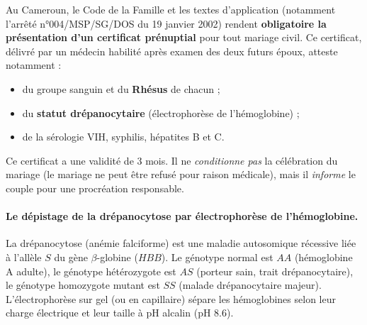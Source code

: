 \documentclass[11pt]{article}
\begin{document}
\begin{savaistu}
Au Cameroun, le Code de la Famille et les textes d'application (notamment l'arrêté n°004/MSP/SG/DOS du 19 janvier 2002) rendent \textbf{obligatoire la présentation d'un certificat prénuptial} pour tout mariage civil. Ce certificat, délivré par un médecin habilité après examen des deux futurs époux, atteste notamment : 
\begin{itemize}
    \item du groupe sanguin et du \textbf{Rhésus} de chacun ;
    \item du \textbf{statut drépanocytaire} (électrophorèse de l'hémoglobine) ;
    \item de la sérologie VIH, syphilis, hépatites B et C.
\end{itemize}
Ce certificat a une validité de \num{3} mois. Il ne \emph{conditionne pas} la célébration du mariage (le mariage ne peut être refusé pour raison médicale), mais il \emph{informe} le couple pour une procréation responsable.
\end{savaistu}

\paragraph{Le dépistage de la drépanocytose par électrophorèse de l'hémoglobine.}
La drépanocytose (anémie falciforme) est une maladie autosomique récessive liée à l'allèle $S$ du gène $\beta$-globine ($HBB$). Le génotype normal est $AA$ (hémoglobine A adulte), le génotype hétérozygote est $AS$ (porteur sain, trait drépanocytaire), le génotype homozygote mutant est $SS$ (malade drépanocytaire majeur). L'électrophorèse sur gel (ou en capillaire) sépare les hémoglobines selon leur charge électrique et leur taille à pH alcalin (pH \num{8,6}).
\end{document}
